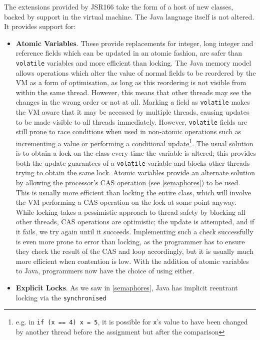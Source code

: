 The extensions provided by JSR166 take the form of a host of new
classes, backed by support in the virtual machine.  The Java language
itself is not altered.  It provides support for:

\begin{itemize}
\item \textbf{Atomic Variables}.  These provide replacements for
  integer, long integer and reference fields which can be updated in
  an atomic fashion, are safer than \texttt{volatile} variables and
  more efficient than locking.  The Java memory model allows
  operations which alter the value of normal fields to be reordered by
  the VM as a form of optimisation, as long as this reordering is not
  visible from within the same thread.  However, this means that other
  threads may see the changes in the wrong order or not at all.
  Marking a field as \texttt{volatile} makes the VM aware that it may
  be accessed by multiple threads, causing updates to be made visible
  to all threads immediately.  However, \texttt{volatile} fields are
  still prone to race conditions when used in non-atomic operations
  such as incrementing a value or performing a conditional
  update\footnote{e.g. in \texttt{if (x == 4) x = 5}, it is possible
    for \texttt{x}'s value to have been changed by another thread
    before the assignment but after the comparison}.  The usual
  solution is to obtain a lock on the class every time the variable is
  altered; this provides both the update guarantees of a
  \texttt{volatile} variable and blocks other threads trying to obtain
  the same lock.  Atomic variables provide an alternate solution by
  allowing the processor's CAS operation (see \ref{semaphores}) to be
  used.  This is usually more efficient than locking the entire class,
  which will involve the VM performing a CAS operation on the lock at
  some point anyway.  While locking takes a pessimistic approach to
  thread safety by blocking all other threads, CAS operations are
  optimistic; the update is attempted, and if it fails, we try again
  until it succeeds.  Implementing such a check successfully is even
  more prone to error than locking, as the programmer has to ensure
  they check the result of the CAS and loop accordingly, but it is
  usually much more efficient when contention is low.  With the
  addition of atomic variables to Java, programmers now have the
  choice of using either.
  \item \textbf{Explicit Locks}.  As we saw in \ref{semaphores}, Java
    has implicit reentrant locking via the \texttt{synchronised}

\end{itemize}

